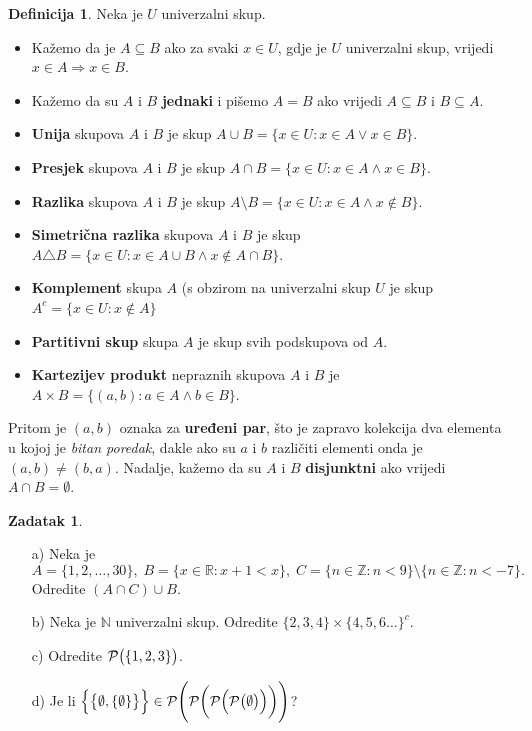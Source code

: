 \documentclass{book}
\let\originalleft\left
\let\originalright\right
\renewcommand{\left}{\mathopen{}\mathclose\bgroup\originalleft}
\renewcommand{\right}{\aftergroup\egroup\originalright}
\theoremstyle{definition}
\theoremstyle{definition}
\newtheorem{definition}{Definicija}
\newtheorem{exercise}{Zadatak}
\theoremstyle{remark}
\begin{document}
\begin{definition} Neka je $U$ univerzalni skup.
\begin{itemize}
\item Kažemo da je $A\subseteq B$ ako za svaki $x\in U$, gdje je $U$ univerzalni skup, vrijedi $x\in A\Rightarrow x\in B$.
\item Kažemo da su $A$ i $B$ \textbf{jednaki} i pišemo $A=B$ ako vrijedi $A\subseteq B$ i $B\subseteq A$.
\item \textbf{Unija} skupova $A$ i $B$ je skup $A\cup B=\{x\in U : x\in A\vee x\in B\}$.
\item \textbf{Presjek} skupova $A$ i $B$ je skup $A\cap B=\{x\in U : x\in A\wedge x\in B\}$.
\item \textbf{Razlika} skupova $A$ i $B$ je skup $A\setminus B=\{x\in U : x\in A\wedge x\notin B\}$.
\item \textbf{Simetrična razlika} skupova $A$ i $B$ je skup $A\triangle B=\{x\in U : x\in A\cup B \wedge x\notin A\cap B\}$.
\item \textbf{Komplement} skupa $A$ (s obzirom na univerzalni skup $U$ je skup $A^c=\{x\in U : x\notin A\}$
\item \textbf{Partitivni skup} skupa $A$ je skup svih podskupova od $A$.
\item \textbf{Kartezijev produkt} nepraznih skupova $A$ i $B$ je $A\times B=\{(a, b) : a\in A \wedge b\in B\}$.
\end{itemize}
Pritom je $(a, b)$ oznaka za \textbf{uređeni par}, što je zapravo kolekcija dva elementa u kojoj je \textit{bitan poredak}, dakle ako su $a$ i $b$ različiti elementi onda je $(a, b)\neq (b, a)$. Nadalje, kažemo da su $A$ i $B$ \textbf{disjunktni} ako vrijedi $A\cap B=\emptyset$.
\end{definition}
\begin{exercise} \textbf{}
\begin{itemize}
\item[a)] Neka je $$A=\{1, 2, \dots, 30\},\; B=\{x\in \mathbb{R} : x+1<x\},\; C=\{n\in \mathbb{Z} : n<9\}\setminus\{n \in \mathbb{Z} : n<-7\}.$$ 
Odredite $(A\cap C)\cup B$.
\item[b)] Neka je $\mathbb{N}$ univerzalni skup. Odredite $\{2, 3, 4\}\times \{4, 5, 6 \dots\}^c$.
\item[c)] Odredite $\mathcal{P}\left(\{1, 2, 3\}\right)$.
\item[d)] Je li $\left\{\left\{\emptyset, \{\emptyset\}\right\}\right\} \in \mathcal{P}\left(\mathcal{P}\left(\mathcal{P}\left(\mathcal{P}\left(\emptyset\right)\right)\right)\right)$?
\end{itemize}
\end{exercise}
\end{document}
